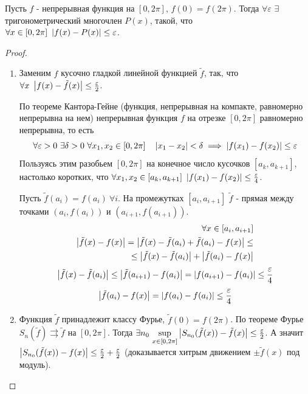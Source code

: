 \begin{theorem*}
    Пусть $f$ - непрерывная функция на $[0, 2\pi]$, $f(0) = f(2\pi)$. Тогда $\forall \varepsilon$ $\exists$ тригонометрический многочлен $P(x)$, такой, что 
    \\ $\forall x \in [0, 2\pi] \ \left| f(x) - P(x) \right| \le \varepsilon$.
    \begin{proof}
        \begin{enumerate}
            \item Заменим $f$ кусочно гладкой линейной функцией $\tilde{f}$, так, что \\ $\forall x \ \left| f(x) - \tilde{f}(x) \right| \le \frac{\varepsilon}{2}$.\par
            По теореме Кантора-Гейне (функция, непрерывная на компакте, равномерно непрерывна на нем) непрерывная функция $f$ на отрезке $[0, 2\pi]$ равномерно непрерывна, то есть
            \[\forall \varepsilon > 0 \ \exists \delta > 0 \ \forall x_1, x_2 \in [0, 2\pi] \quad \left| x_1 - x_2 \right| < \delta \implies \left| f(x_1) - f(x_2) \right| \le \varepsilon\]
            Пользуясь этим разобьем $[0, 2\pi]$ на конечное число кусочков $[a_k, a_{k+1}]$, настолько коротких, что $\forall x_1, x_2  \in [a_k, a_{k+1}] \ \left| f(x_1) - f(x_2) \right| \le \frac{\varepsilon}{4}$.
            \par
            Пусть $\tilde{f}(a_i) = f(a_i) \ \forall i$. На промежутках $[a_i, a_{i+1}]$ $\tilde{f}$ - прямая между точками $(a_i, f(a_i))$ и $(a_{i+1}, f(a_{i+1}))$.
            \begin{align*}
                \forall x \in [a_i, a_{i+1}] \\
                \left| \tilde{f}(x) - f(x) \right| = \left| \tilde{f}(x) - \tilde{f}(a_i) + \tilde{f}(a_i) - f(x) \right| \le \\
                \le \left| \tilde{f}(x) - \tilde{f}(a_i) \right| + \left| \tilde{f}(a_i) - f(x) \right|
            \end{align*}
            \begin{align*}
                \left| \tilde{f}(x) - \tilde{f}(a_i) \right| \le \left| \tilde{f}(a_{i+1}) - f(a_i) \right| = \left| f(a_{i+1}) - f(a_i) \right| \le \frac{\varepsilon}{4}
            \end{align*}
            \[\left| \tilde{f}(a_i) - f(x) \right| = \left| f(a_i) - f(a_i) \right| \le \frac{\varepsilon}{4}\]

            \item Функция $\tilde{f}$ принадлежит классу Фурье, $\tilde{f}(0) = f(2\pi)$. По теореме Фурье $S_n(\tilde{f}) \rightrightarrows \tilde{f}$ на $[0, 2\pi]$. Тогда $\exists n_0 \ \underset{x \in [0, 2\pi]}{\sup}\left| S_{n_0}(\tilde{f}(x)) - \tilde{f}(x) \right| \le \frac{\varepsilon}{2}$. А значит $\left| S_{n_0}(\tilde{f}(x)) - f(x) \right| \le \frac{\varepsilon}{2} + \frac{\varepsilon}{2}$ (доказывается хитрым движением $\pm \tilde{f}(x)$ под модуль).
        \end{enumerate}
    \end{proof}
\end{theorem*}

